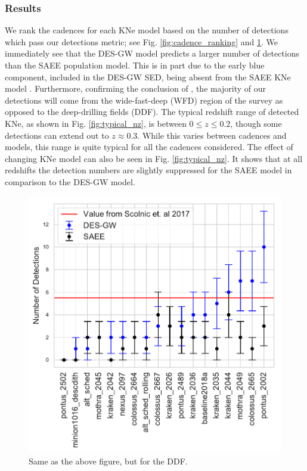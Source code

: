 \subsubsection{Results}
We rank the cadences for each KNe model based on the number of detections which pass our detections metric; see Fig. \ref{fig:cadence_ranking} and \ref{fig:cadence_ranking_ddf}. We immediately see that the DES-GW model predicts a larger number of detections than the SAEE population model. This is in part due to the early blue component, included in the DES-GW SED, being absent from the SAEE KNe model \citep{Villar2017b}. Furthermore, confirming the conclusion of \citet{Scolnic2017a}, the majority of our detections will come from the wide-fast-deep (WFD) region of the survey as opposed to the deep-drilling fields (DDF). The typical redshift range of detected KNe, as shown in Fig. \ref{fig:typical_nz}, is between $0 \leq z \leq 0.2$, though some detections can extend out to $z \approx 0.3$. While this varies between cadences and models, this range is quite typical for all the cadences considered. The effect of changing KNe model can also be seen in Fig. \ref{fig:typical_nz}. It shows that at all redshifts the detection numbers are slightly suppressed for the SAEE model in comparison to the DES-GW model.

\begin{figure}[h!]
  \centering
  \includegraphics[scale=0.79]{figures/ddf_detection_counts_by_cadence}
  \caption{Same as the above figure, but for the DDF.}
  \label{fig:cadence_ranking_ddf}
\end{figure}

